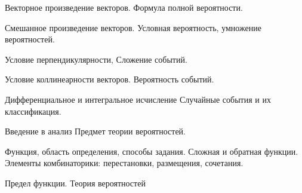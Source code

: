 \documentclass[
	14pt,
	a4paper,
	]
	{scrartcl}
\begin{document}
\vfill

\newpage


\shapk
{}
\setcounter{zad}{0}

\vfill
\z 	Векторное произведение векторов.
 \vfill
\z 	Формула полной вероятности. 
 \vfill

\vfill

\newpage


\shapk
{}
\setcounter{zad}{0}

\vfill
\z 	Смешанное произведение векторов.
 \vfill
\z 	Условная вероятность, умножение вероятностей.
 \vfill

\vfill

\newpage


\shapk
{}
\setcounter{zad}{0}

\vfill
\z 	Условие перпендикулярности, 
 \vfill
\z 	Сложение событий.
 \vfill

\vfill

\newpage


\shapk
{}
\setcounter{zad}{0}

\vfill
\z 	Условие коллинеарности векторов.
 \vfill
\z 	Вероятность событий. 
 \vfill

\vfill

\newpage


\shapk
{}
\setcounter{zad}{0}

\vfill
\z 	Дифференциальное и интегральное исчисление
 \vfill
\z 	Случайные события и их классификация.
 \vfill

\vfill

\newpage


\shapk
{}
\setcounter{zad}{0}

\vfill
\z 	Введение в анализ
 \vfill
\z 	Предмет теории вероятностей.
 \vfill

\vfill

\newpage


\shapk
{}
\setcounter{zad}{0}

\vfill
\z 	Функция, область определения, способы задания. Сложная и обратная функции.
 \vfill
\z 	Элементы комбинаторики: перестановки, размещения, сочетания.
 \vfill

\vfill

\newpage


\shapk
{}
\setcounter{zad}{0}

\vfill
\z 	Предел функции.
 \vfill
\z 	Теория вероятностей
 \vfill
\end{document}
